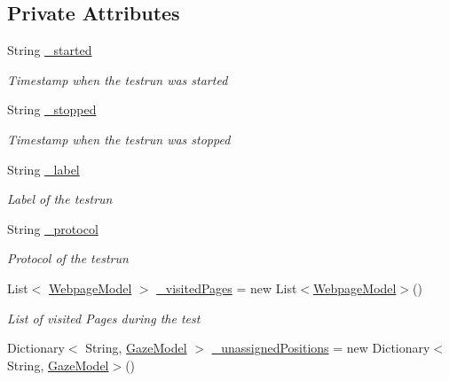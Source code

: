 \subsection*{Private Attributes}
\begin{DoxyCompactItemize}
\item 
String \hyperlink{class_web_analyzer_1_1_models_1_1_data_model_1_1_test_model_a81e009853a2999fac79631cfcd0ed4db}{\+\_\+started}
\begin{DoxyCompactList}\small\item\em Timestamp when the testrun was started \end{DoxyCompactList}\item 
String \hyperlink{class_web_analyzer_1_1_models_1_1_data_model_1_1_test_model_a6253cabd7bb33c13da5927853cc8d228}{\+\_\+stopped}
\begin{DoxyCompactList}\small\item\em Timestamp when the testrun was stopped \end{DoxyCompactList}\item 
String \hyperlink{class_web_analyzer_1_1_models_1_1_data_model_1_1_test_model_a00ce1716b13b35172fb8ac3498d6f04b}{\+\_\+label}
\begin{DoxyCompactList}\small\item\em Label of the testrun \end{DoxyCompactList}\item 
String \hyperlink{class_web_analyzer_1_1_models_1_1_data_model_1_1_test_model_ac85ac6bfbbd03a3e1860822a74ce8649}{\+\_\+protocol}
\begin{DoxyCompactList}\small\item\em Protocol of the testrun \end{DoxyCompactList}\item 
List$<$ \hyperlink{class_web_analyzer_1_1_models_1_1_data_model_1_1_webpage_model}{Webpage\+Model} $>$ \hyperlink{class_web_analyzer_1_1_models_1_1_data_model_1_1_test_model_a849d23a83d37ac0e965c3946d8085aa2}{\+\_\+visited\+Pages} = new List$<$\hyperlink{class_web_analyzer_1_1_models_1_1_data_model_1_1_webpage_model}{Webpage\+Model}$>$()
\begin{DoxyCompactList}\small\item\em List of visited Pages during the test \end{DoxyCompactList}\item 
Dictionary$<$ String, \hyperlink{class_web_analyzer_1_1_models_1_1_data_model_1_1_gaze_model}{Gaze\+Model} $>$ \hyperlink{class_web_analyzer_1_1_models_1_1_data_model_1_1_test_model_a1eaf774e73692913671ff3cb85f5772e}{\+\_\+unassigned\+Positions} = new Dictionary$<$String, \hyperlink{class_web_analyzer_1_1_models_1_1_data_model_1_1_gaze_model}{Gaze\+Model}$>$()

\end{DoxyCompactItemize}
